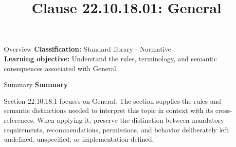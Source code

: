 \documentclass[10pt,letterpaper]{article}
\title{Clause 22.10.18.01: General}
\author{}
\date{}
\begin{document}
\maketitle
\begin{CornellOverviewBox}{Overview}
\textbf{Classification:} Standard library - Normative\\[2pt]
\textbf{Learning objective:} Understand the rules, terminology, and semantic consequences associated with General.
\end{CornellOverviewBox}\begin{CornellSummaryBox}{Summary}
{\sffamily\bfseries\color{Accent} Summary}\par\vspace{3pt}Section 22.10.18.1 focuses on General. The section supplies the rules and semantic distinctions needed to interpret this topic in context with its cross-references. When applying it, preserve the distinction between mandatory requirements, recommendations, permissions, and behavior deliberately left undefined, unspecified, or implementation-defined.
\end{CornellSummaryBox}
\end{document}
